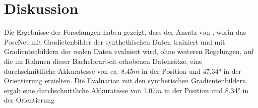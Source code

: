 
\section{Diskussion}
\label{sec:kapitel_5}
Die Ergebnisse der Forschungen haben gezeigt, dass der Ansatz von \citet{acharyaBIMPoseNetIndoorCamera2019}, worin das PoseNet mit Gradietenbilder der synthethischen Daten trainiert und mit Gradientenbildern der realen Daten evaluiert wird, ohne weiteren Regelungen, auf die im Rahmen dieser Bachelorarbeit erhobenen Datensätze, eine durchschnittliche Akkuratesse von ca. 8.45$m$ in der Position und 47.34° in der Orientierung erzielten. Die Evaluation mit den synthetischen Gradientenbildern ergab eine durchschnittliche Akkuratesse von 1.07$m$ in der Position und 8.34° in der Orientierung